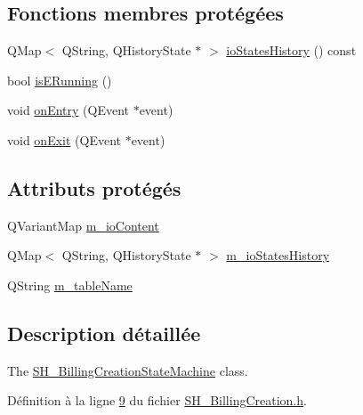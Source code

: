 \subsection*{Fonctions membres protégées}
\begin{DoxyCompactItemize}
\item 
Q\-Map$<$ Q\-String, Q\-History\-State $\ast$ $>$ \hyperlink{classSH__InOutStateMachine_a13889998c6dcd17db984dd6ed1454e80}{io\-States\-History} () const 
\item 
bool \hyperlink{classSH__InOutStateMachine_ae6c7448fbe267b035017108a9ffdff2e}{is\-E\-Running} ()
\item 
void \hyperlink{classSH__GenericStateMachine_adfd82f2532595ed7c4bcf21f03cbb951}{on\-Entry} (Q\-Event $\ast$event)
\item 
void \hyperlink{classSH__GenericStateMachine_a4b36d60fa1876908493d3d07f191a30f}{on\-Exit} (Q\-Event $\ast$event)
\end{DoxyCompactItemize}
\subsection*{Attributs protégés}
\begin{DoxyCompactItemize}
\item 
Q\-Variant\-Map \hyperlink{classSH__InOutStateMachine_a8cfbc27eef057bf37b7711bdfef2077e}{m\-\_\-io\-Content}
\item 
Q\-Map$<$ Q\-String, Q\-History\-State $\ast$ $>$ \hyperlink{classSH__InOutStateMachine_ac46ad1af230e1b2156d805275690dec3}{m\-\_\-io\-States\-History}
\item 
Q\-String \hyperlink{classSH__InOutStateMachine_aa009eecc5ab6181358faafb5996b6006}{m\-\_\-table\-Name}
\end{DoxyCompactItemize}


\subsection{Description détaillée}
The \hyperlink{classSH__BillingCreationStateMachine}{S\-H\-\_\-\-Billing\-Creation\-State\-Machine} class. 

Définition à la ligne \hyperlink{SH__BillingCreation_8h_source_l00009}{9} du fichier \hyperlink{SH__BillingCreation_8h_source}{S\-H\-\_\-\-Billing\-Creation.\-h}.



